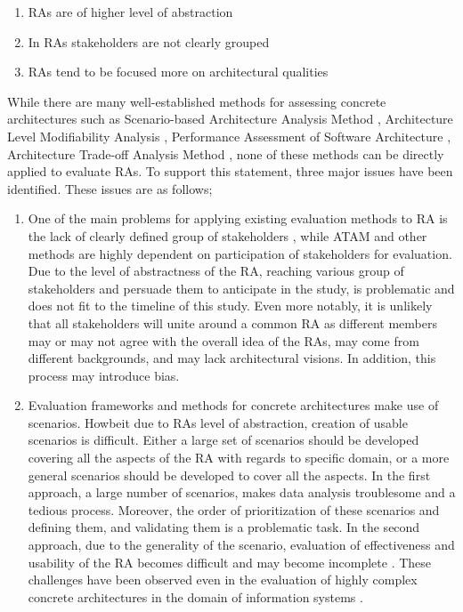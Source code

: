 \documentclass{bmcart}
\begin{document}
\begin{enumerate}
    \item RAs are of higher level of abstraction
    \item In RAs stakeholders are not clearly grouped
    \item RAs tend to be focused more on architectural qualities
\end{enumerate}

While there are many well-established methods for assessing concrete architectures such as Scenario-based Architecture Analysis Method \cite{kazman1994saam}, Architecture Level Modifiability Analysis \cite{Bengtsson}, Performance Assessment of Software Architecture \cite{Williams}, Architecture Trade-off Analysis Method \cite{KazmanATAM}, none of these methods can be directly applied to evaluate RAs. To support this statement, three major issues have been identified. These issues are as follows;

\begin{enumerate}
    \item One of the main problems for applying existing evaluation methods to RA is the lack of clearly defined group of stakeholders \cite{angelov2008towards}, while ATAM and other methods are highly dependent on participation of stakeholders for evaluation. Due to the level of abstractness of the RA, reaching various group of stakeholders and persuade them to anticipate in the study, is problematic and does not fit to the timeline of this study. Even more notably, it is unlikely that all stakeholders will unite around a common RA as different members may or may not agree with the overall idea of the RAs, may come from different backgrounds, and may lack architectural visions. In addition, this process may introduce bias.
    \item Evaluation frameworks and methods for concrete architectures make use of scenarios. Howbeit due to RAs level of abstraction, creation of usable scenarios is difficult. Either a large set of scenarios should be developed covering all the aspects of the RA with regards to specific domain, or a more general scenarios should be developed to cover all the aspects. In the first approach, a large number of scenarios, makes data analysis troublesome and a tedious process. Moreover, the order of prioritization of these scenarios and defining them, and validating them is a problematic task. In the second approach, due to the generality of the scenario, evaluation of effectiveness and usability of the RA becomes difficult and may become incomplete \cite{Avgeriou}. These challenges have been observed even in the evaluation of highly complex concrete architectures in the domain of information systems \cite{bengtsson1998scenario}.
\end{enumerate}
\end{document}
